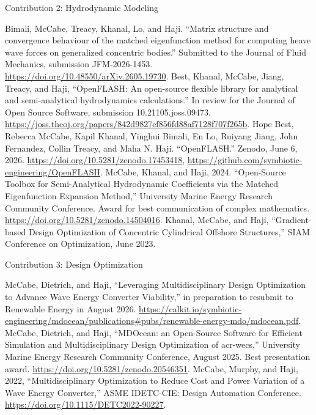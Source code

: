 %
\noindent
Contribution 2: Hydrodynamic Modeling
\begin{typedlist}
   Bimali, McCabe, Treacy, Khanal, Lo, and Haji. ``Matrix structure and convergence behaviour of the matched eigenfunction method for computing heave wave forces on generalized concentric bodies.'' Submitted to the Journal of Fluid Mechanics, submission JFM-2026-1453. \url{https://doi.org/10.48550/arXiv.2605.19730}.
   Best, Khanal, McCabe, Jiang, Treacy, and Haji, ``OpenFLASH: An open-source flexible library for analytical and semi-analytical hydrodynamics calculations.'' In review for the Journal of Open Source Software, submission 10.21105.joss.09473. \url{https://joss.theoj.org/papers/842d9827ef856fd88af7128f707f265b}.
   Hope Best, Rebecca McCabe, Kapil Khanal, Yinghui Bimali, En Lo, Ruiyang Jiang, John Fernandez, Collin Treacy, and Maha N. Haji. ``OpenFLASH.'' Zenodo, June 6, 2026. \url{https://doi.org/10.5281/zenodo.17453418}, \url{https://github.com/symbiotic-engineering/OpenFLASH}.
   McCabe, Khanal, and Haji, 2024. ``Open-Source Toolbox for Semi-Analytical Hydrodynamic Coefficients via the Matched Eigenfunction Expansion Method,'' University Marine Energy Research Community Conference. Award for best communication of complex mathematics. \url{https://doi.org/10.5281/zenodo.14504016}.
   Khanal, McCabe, and Haji, ``Gradient-based Design Optimization of Concentric Cylindrical Offshore Structures,'' SIAM Conference on Optimization, June 2023.
\end{typedlist}
%
\noindent
Contribution 3: Design Optimization
\begin{typedlist}
     McCabe, Dietrich, and Haji, ``Leveraging Multidisciplinary Design Optimization to Advance Wave Energy Converter Viability,'' in preparation to resubmit to Renewable Energy in August 2026. \url{https://calkit.io/symbiotic-engineering/mdocean/publications#pubs/renewable-energy-mdo/mdocean.pdf}.
     McCabe, Dietrich, and Haji, ``MDOcean: an Open-Source Software for Efficient Simulation and Multidisciplinary Design Optimization of \glspl{acr-wec},'' University Marine Energy Research Community Conference, August 2025. Best presentation award. \url{https://doi.org/10.5281/zenodo.20546351}.
     McCabe, Murphy, and Haji, 2022, ``Multidisciplinary Optimization to Reduce Cost and Power Variation of a Wave Energy Converter,'' ASME IDETC-CIE: Design Automation Conference. \url{https://doi.org/10.1115/DETC2022-90227}.
\end{typedlist}
%
